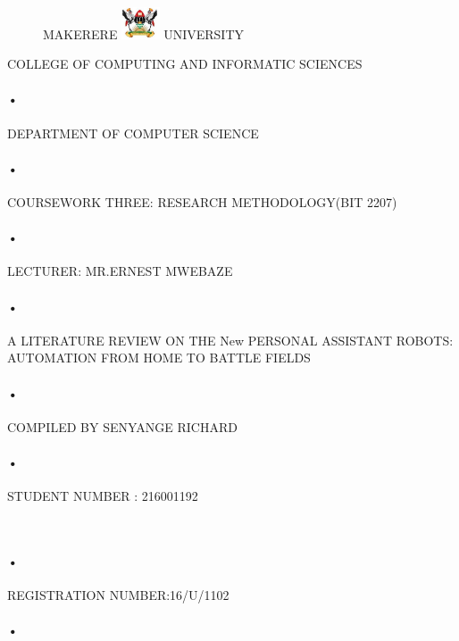 \documentclass[09pt,a4paper]{article}
\begin{document}
\begin{titlepage}
 \begin{figure}[h]
  \centerline{\small MAKERERE 
  \includegraphics[width=0.1\textwidth]{muklog} UNIVERSITY}
\end{figure}
\centerline{COLLEGE OF COMPUTING AND INFORMATIC SCIENCES}
\paragraph{•}
\centerline{DEPARTMENT OF COMPUTER SCIENCE\\}
\paragraph{•}

\centerline{COURSEWORK THREE: RESEARCH METHODOLOGY(BIT 2207)\\}
\paragraph{•}
\centerline{LECTURER: MR.ERNEST MWEBAZE}
\paragraph{•}
         \centerline{  A LITERATURE REVIEW ON THE New PERSONAL ASSISTANT ROBOTS:\\
                                 AUTOMATION FROM HOME TO BATTLE FIELDS\\}
\paragraph{•}
\centerline{COMPILED BY
 SENYANGE RICHARD}
 \paragraph{•}
\centerline{STUDENT NUMBER : 216001192}\
\paragraph{•}
\centerline{REGISTRATION NUMBER:16/U/1102}
\paragraph{•}
\end{titlepage}
\end{document}
